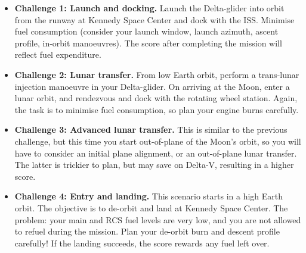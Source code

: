 \documentclass[Orbiter User Manual.tex]{subfiles}
\begin{document}
\begin{itemize}
\item \textbf{Challenge 1: Launch and docking.} Launch the Delta-glider into orbit from the runway at Kennedy Space Center and dock with the ISS. Minimise fuel consumption (consider your launch window, launch azimuth, ascent profile, in-orbit manoeuvres). The score after completing the mission will reflect fuel expenditure.
\item \textbf{Challenge 2: Lunar transfer.} From low Earth orbit, perform a trans-lunar injection manoeuvre in your Delta-glider. On arriving at the Moon, enter a lunar orbit, and rendezvous and dock with the rotating wheel station. Again, the task is to minimise fuel consumption, so plan your engine burns carefully.
\item \textbf{Challenge 3: Advanced lunar transfer.} This is similar to the previous challenge, but this time you start out-of-plane of the Moon’s orbit, so you will have to consider an initial plane alignment, or an out-of-plane lunar transfer. The latter is trickier to plan, but may save on Delta-V, resulting in a higher score.
\item \textbf{Challenge 4: Entry and landing.} This scenario starts in a high Earth orbit. The objective is to de-orbit and land at Kennedy Space Center. The problem: your main and RCS fuel levels are very low, and you are not allowed to refuel during the mission. Plan your de-orbit burn and descent profile carefully! If the landing succeeds, the score rewards any fuel left over.
\end{itemize}
\end{document}
